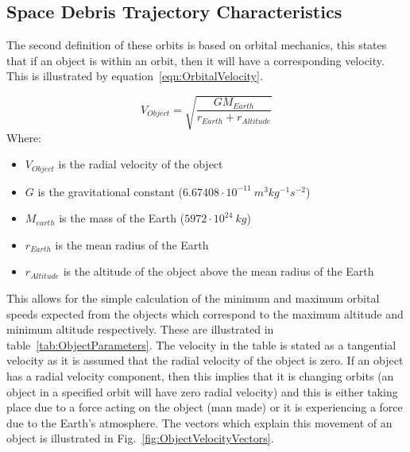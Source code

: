 \documentclass[11pt]{witseiepaper}
\begin{document}
\begin{bibunit}[witseie]
\subsection{Space Debris Trajectory Characteristics} \label{sec:SpaceDebrisTrajectoryCharacteristics}
The second definition of these orbits is based on orbital mechanics, this states that if an object is within an orbit, then it will have a corresponding velocity.
This is illustrated by equation~\ref{eqn:OrbitalVelocity}. 

\begin{equation} \label{eqn:OrbitalVelocity}
    V_{Object} = \sqrt{\frac{G M_{Earth}}{r_{Earth} + r_{Altitude}}}
\end{equation}
Where:
\begin{itemize}
    \item $V_{Object}$ is the radial velocity of the object
    \item $G$ is the gravitational constant ($6.67408 \cdot 10^{-11}~m^3 kg^{-1} s^{-2}$)
    \item $M_{earth}$ is the mass of the Earth ($5972 \cdot 10^{24}~kg$)
    \item $r_{Earth}$ is the mean radius of the Earth
    \item $r_{Altitude}$ is the altitude of the object above the mean radius of the Earth
\end{itemize}

This allows for the simple calculation of the minimum and maximum orbital speeds expected from the objects which correspond to the maximum altitude and minimum altitude respectively. These are illustrated in table~\ref{tab:ObjectParameters}. The velocity in the table is stated as a tangential velocity as it is assumed that the radial velocity of the object is zero. If an object has a radial velocity component, then this implies that it is changing orbits (an object in a specified orbit will have zero radial velocity) and this is either taking place due to a force acting on the object (man made) or it is experiencing a force due to the Earth's atmosphere. The vectors which explain this movement of an object is illustrated in Fig.~\ref{fig:ObjectVelocityVectors}.


\end{bibunit}
\end{document}
